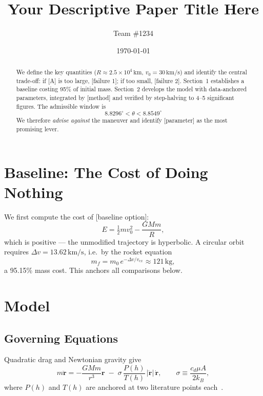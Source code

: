 \documentclass[final,3p,times,onecolumn]{elsarticle}
\newcommand{\vect}[1]{\boldsymbol{#1}}
\newcommand{\unit}[1]{\,\mathrm{#1}}
\begin{document}
\begin{frontmatter}

\title{Your Descriptive Paper Title Here}
\author{Team \#1234}
\address{Problem A}
\date{\today}

\begin{abstract}
We define the key quantities ($R \approx 2.5\times10^{4}\unit{km}$,
$v_0 = 30\unit{km/s}$) and identify the central trade-off: if [A] is too large,
[failure 1]; if too small, [failure 2].
Section~1 establishes a baseline costing 95\% of initial mass.
Section~2 develops the model with data-anchored parameters, integrated by
[method] and verified by step-halving to 4--5 significant figures.
The admissible window is
\[
  \boxed{\;8.8296^\circ < \theta < 8.8549^\circ\;}
\]
We therefore \emph{advise against} the maneuver and identify [parameter] as the
most promising lever.
\end{abstract}


\end{frontmatter}

\section{Baseline: The Cost of Doing Nothing}
We first compute the cost of [baseline option]:
\begin{equation}
  E = \tfrac12 m v_0^2 - \frac{GMm}{R},
\end{equation}
which is positive --- the unmodified trajectory is hyperbolic. A circular orbit
requires $\Delta v = 13.62\unit{km/s}$, i.e.\ by the rocket equation
\begin{equation}
  m_f = m_0\, e^{-\Delta v / v_{ex}} \approx 121\unit{kg},
  \label{eq:rocket}
\end{equation}
a 95.15\% mass cost. This anchors all comparisons below.

\section{Model}
\subsection{Governing Equations}
Quadratic drag and Newtonian gravity give
\begin{equation}
  m\ddot{\vect{r}} = -\frac{GMm}{r^3}\vect{r}
  \;-\; \sigma\,\frac{P(h)}{T(h)}\,|\dot{\vect r}|\,\dot{\vect{r}},
  \qquad \sigma \equiv \frac{c_d \mu A}{2k_B},
  \label{eq:eom}
\end{equation}
where $P(h)$ and $T(h)$ are anchored at two literature points each~\cite{Key1993}.
\end{document}

